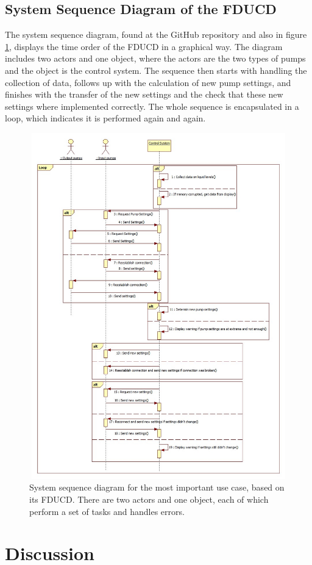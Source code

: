 \documentclass[11pt, A4paper, english]{article}
\begin{document}
		\subsection{System Sequence Diagram of the FDUCD}
The system sequence diagram, found at the GitHub repository and also in figure \ref{im:SSD}, displays the time order of the FDUCD in a graphical way. The diagram includes two actors and one object, where the actors are the two types of pumps and the object is the control system. The sequence then starts with handling the collection of data, follows up with the calculation of new pump settings, and finishes with the transfer of the new settings and the check that these new settings where implemented correctly. The whole sequence is encapsulated in a loop, which indicates it is performed again and again.
			\begin{figure}[H]
\includegraphics[width=12.8cm, height=15cm]{SequenceDiagram.jpg}
\caption{System sequence diagram for the most important use case, based on its FDUCD. There are two actors and one object, each of which perform a set of tasks and handles errors.}
\label{im:SSD}
			\end{figure}
	
	\section{Discussion}
\end{document}

